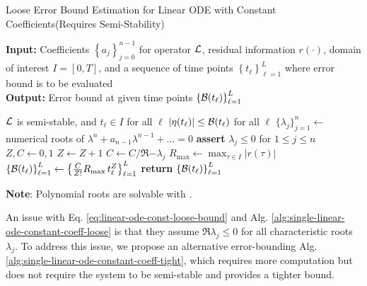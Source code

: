     \begin{algorithm}
        \caption{Loose Error Bound Estimation for Linear ODE with Constant Coefficients\quad (Requires Semi-Stability)}\label{alg:single-linear-ode-constant-coeff-loose}
        \textbf{Input:} Coefficients $\left\{a_j\right\}_{j=0}^{n-1}$ for operator $\mathcal{L}$, residual information $r(\cdot)$, domain of interest $I = [0, T]$, and a sequence of time points $\left\{t_\ell\right\}_{\ell=1}^{L}$ where error bound is to be evaluated\\
        \textbf{Output:} Error bound at given time points $\left\{\mathcal{B}(t_\ell)\right\}_{\ell=1}^{L}$
        \begin{algorithmic}
            \Require $\mathcal{L}$ is semi-stable, and $t_\ell \in I$ for all $\ell$
            \Ensure $\left|\eta(t_\ell)\right| \leq \mathcal{B}(t_\ell)$ for all $\ell$
            \State $\{\lambda_j\}_{j=1}^{n} \gets$ numerical roots of $\lambda^n+a_{n-1}\lambda^{n-1}+\dots=0$ 
            \State \textbf{assert} $\lambda_j \leq 0$ for $1 \leq j \leq n$ 
            \State $Z, C \gets 0, 1$
                    \State $Z \gets Z + 1$
                \Else
                    \State $C \gets C / \Re{-\lambda_j}$
                \EndIf
            \EndFor
            \State $R_{\max} \gets \max_{\tau \in I} |r(\tau)|$ 
            \State $\left\{\mathcal{B}(t_\ell)\right\}_{\ell=1}^{L} \gets \left\{\frac{C}{Z!}R_{\max}\, t_\ell^{Z}\right\}_{\ell=1}^{L}$
            \State \textbf{return} $\left\{\mathcal{B}(t_\ell)\right\}_{\ell=1}^{L}$
        \end{algorithmic}
        \vspace{0.5em} 
        \textbf{Note}: Polynomial roots are solvable with \citeauthor{jenkins1970three} \cite{jenkins1970three}.
    \end{algorithm}

    An issue with Eq. \eqref{eq:linear-ode-const-loose-bound} and Alg. \ref{alg:single-linear-ode-constant-coeff-loose} is that they assume $\Re{\lambda_j} \leq 0$ for all characteristic roots $\lambda_j$. 
    To address this issue, we propose an alternative error-bounding Alg. \ref{alg:single-linear-ode-constant-coeff-tight}, which requires more computation but does not require the system to be semi-stable and provides a tighter bound.

